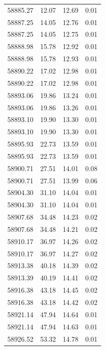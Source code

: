 \begin{longtable}{|c|c|c|c|}
 58885.27 &   12.07 &       12.69 &          0.01 \\
 58887.25 &   14.05 &       12.76 &          0.01 \\
 58887.25 &   14.05 &       12.75 &          0.01 \\
 58888.98 &   15.78 &       12.92 &          0.01 \\
 58888.98 &   15.78 &       12.93 &          0.01 \\
 58890.22 &   17.02 &       12.98 &          0.01 \\
 58890.22 &   17.02 &       12.98 &          0.01 \\
 58893.06 &   19.86 &       13.24 &          0.01 \\
 58893.06 &   19.86 &       13.26 &          0.01 \\
 58893.10 &   19.90 &       13.30 &          0.01 \\
 58893.10 &   19.90 &       13.30 &          0.01 \\
 58895.93 &   22.73 &       13.59 &          0.01 \\
 58895.93 &   22.73 &       13.59 &          0.01 \\
 58900.71 &   27.51 &       14.01 &          0.08 \\
 58900.71 &   27.51 &       13.99 &          0.06 \\
 58904.30 &   31.10 &       14.04 &          0.01 \\
 58904.30 &   31.10 &       14.04 &          0.01 \\
 58907.68 &   34.48 &       14.23 &          0.02 \\
 58907.68 &   34.48 &       14.21 &          0.02 \\
 58910.17 &   36.97 &       14.26 &          0.02 \\
 58910.17 &   36.97 &       14.27 &          0.02 \\
 58913.38 &   40.18 &       14.39 &          0.02 \\
 58913.39 &   40.19 &       14.41 &          0.02 \\
 58916.38 &   43.18 &       14.45 &          0.02 \\
 58916.38 &   43.18 &       14.42 &          0.02 \\
 58921.14 &   47.94 &       14.64 &          0.01 \\
 58921.14 &   47.94 &       14.63 &          0.01 \\
 58926.52 &   53.32 &       14.78 &          0.01 \\

\end{longtable}
